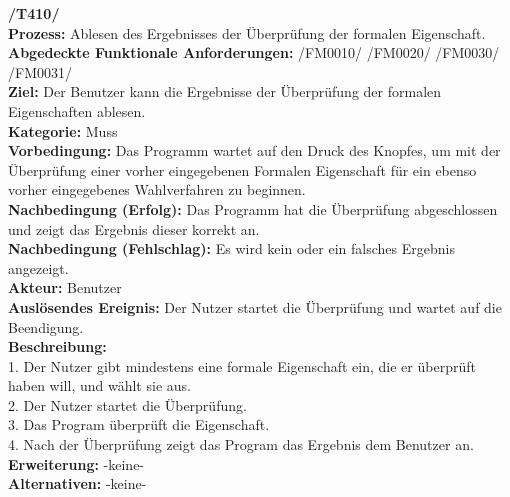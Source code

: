 \documentclass[a4paper]{scrreprt}
\begin{document}
\textbf{/T410/}\\
\textbf{Prozess: }Ablesen des Ergebnisses der Überprüfung der formalen Eigenschaft. \\
\textbf{Abgedeckte Funktionale Anforderungen:} /FM0010/ /FM0020/ /FM0030/ /FM0031/ \\
\textbf{Ziel:} Der Benutzer kann die Ergebnisse der Überprüfung der formalen
Eigenschaften ablesen.\\
\textbf{Kategorie:} Muss\\
\textbf{Vorbedingung:} Das Programm wartet auf den Druck des Knopfes, um mit
der Überprüfung einer vorher eingegebenen Formalen Eigenschaft für ein ebenso
vorher eingegebenes Wahlverfahren zu beginnen.\\
\textbf{Nachbedingung (Erfolg):} Das Programm hat die Überprüfung abgeschlossen
und zeigt das Ergebnis dieser korrekt an.\\
\textbf{Nachbedingung (Fehlschlag):} Es wird kein oder ein falsches Ergebnis
angezeigt.\\
\textbf{Akteur:} Benutzer\\
\textbf{Auslösendes Ereignis:} Der Nutzer startet die Überprüfung und wartet
auf die Beendigung.	\\
\textbf{Beschreibung:} \\
1. Der Nutzer gibt mindestens eine formale Eigenschaft ein, die er überprüft
haben will, und wählt sie aus. \\
2. Der Nutzer startet die Überprüfung.\\
3. Das Program überprüft die Eigenschaft. \\
4. Nach der Überprüfung zeigt das Program das Ergebnis dem Benutzer an. \\
\textbf {Erweiterung:} -keine- \\
\textbf {Alternativen:} -keine- \\ \\
\end{document}

